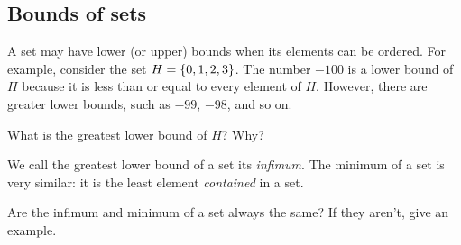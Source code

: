 \documentclass{book}
\begin{document}
\subsection{Bounds of sets}
A set may have lower (or upper) bounds when its elements can be ordered. For example, consider the set $H = \{0, 1, 2, 3\}$. The number $-100$ is a lower bound of $H$ because it is less than or equal to every element of $H$. However, there are greater lower bounds, such as $-99$, $-98$, and so on.
\begin{exercise}\label{lowerbound}
What is the greatest lower bound of $H$? Why?
\end{exercise}
We call the greatest lower bound of a set its \textit{infimum}. The minimum of a set is very similar: it is the least element \emph{contained} in a set.
\begin{exercise}\label{reallower}
Are the infimum and minimum of a set always the same? If they aren't, give an example.
\end{exercise}
\end{document}
